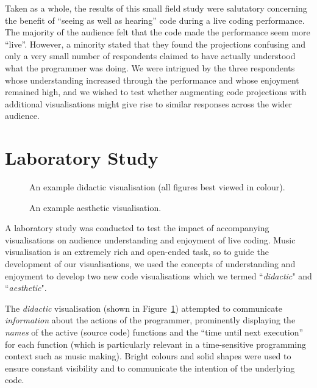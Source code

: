\documentclass{sig-alternate}
\begin{document}
Taken as a whole, the results of this small field study were
salutatory concerning the benefit of ``seeing as well as hearing''
code during a live coding performance. The majority of the audience
felt that the code made the performance seem more ``live''. However, a
minority stated that they found the projections confusing and only a
very small number of respondents claimed to have actually understood
what the programmer was doing. We were intrigued by the three
respondents whose understanding increased through the performance and
whose enjoyment remained high, and we wished to test whether
augmenting code projections with additional visualisations might give
rise to similar responses across the wider audience.

\section{Laboratory Study}

\begin{figure}
\centering
{}
\caption{An example didactic visualisation (all
  figures best viewed in colour).}
\label{fig:didactic-visualisation}
\end{figure}

\begin{figure}
\centering
{}
\caption{An example aesthetic visualisation.}
\label{fig:aesthetic-visualisation}
\end{figure}

A laboratory study was conducted to test the impact of accompanying
visualisations on audience understanding and enjoyment of live coding.
Music visualisation is an extremely rich and open-ended task, so to
guide the development of our visualisations, we used the concepts of
understanding and enjoyment to develop two new code visualisations
which we termed ``\emph{didactic}" and ``\emph{aesthetic}".

The \emph{didactic} visualisation (shown in
Figure~\ref{fig:didactic-visualisation}) attempted to communicate
\emph{information} about the actions of the programmer, prominently
displaying the \emph{names} of the active (source code) functions and
the ``time until next execution'' for each function (which is
particularly relevant in a time-sensitive programming context such as
music making). Bright colours and solid shapes were used to ensure
constant visibility and to communicate the intention of the underlying
code.
\end{document}
